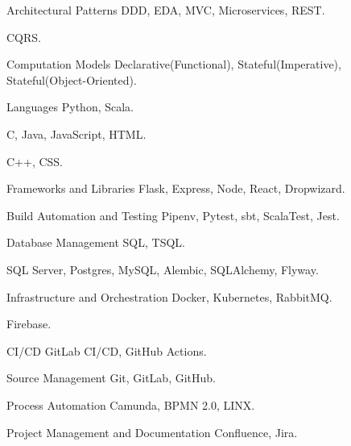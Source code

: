   \begin{cvskills}
    \cvskill
      {Architectural Patterns}
      { DDD, EDA, MVC, Microservices, REST.}

    \cvskill
      {}
      { CQRS.}

    \cvskill
      {Computation Models}
      { Declarative(Functional), Stateful(Imperative), Stateful(Object-Oriented).}

    \cvskill
      {Languages}
      { Python, Scala.}

    \cvskill
      {}
      { C, Java, JavaScript, HTML.}

    \cvskill
      {}
      { C++, CSS.}

    \cvskill
      {Frameworks and Libraries}
      { Flask, Express, Node, React, Dropwizard.}

    \cvskill
      {Build Automation and Testing}
      { Pipenv, Pytest, sbt, ScalaTest, Jest.}

    \cvskill
      {Database Management}
      { SQL, TSQL.}

    \cvskill
      {}
      { SQL Server, Postgres, MySQL, Alembic, SQLAlchemy, Flyway.}

    \cvskill
      {Infrastructure and Orchestration}
      { Docker, Kubernetes, RabbitMQ.}

    \cvskill
      {}
      { Firebase.}

    \cvskill
      {CI/CD}
      { GitLab CI/CD, GitHub Actions.}

    \cvskill
      {Source Management}
      { Git, GitLab, GitHub.}

    \cvskill
      {Process Automation}
      { Camunda, BPMN 2.0, LINX.}

    \cvskill
      {Project Management and Documentation}
      { Confluence, Jira.}
  \end{cvskills}
